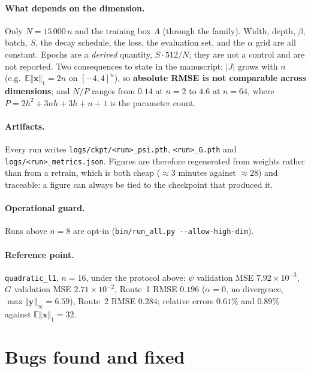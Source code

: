 \documentclass[11pt]{article}
\newcommand{\file}[1]{\texttt{#1}}
\newcommand{\bx}{\boldsymbol{x}}
\newcommand{\by}{\boldsymbol{y}}
\newcommand{\abs}[1]{\left\vert #1 \right\vert}
\newcommand{\norminf}[1]{\left\Vert #1 \right\Vert_{\infty}}
\newcommand{\normone}[1]{\left\Vert #1 \right\Vert_{1}}
\begin{document}
\paragraph{What depends on the dimension.} Only $N=15\,000\,n$ and the training
box $A$ (through the family). Width, depth, $\beta$, batch, $S$, the decay
schedule, the loss, the evaluation set, and the $\alpha$ grid are all constant. Epochs are a \emph{derived} quantity, $S\cdot512/N$; they are not a control and are
not reported. Two consequences to state in the manuscript: $\abs{J}$ grows with
$n$ (e.g.\ $\mathbb{E}\normone{\bx}=2n$ on $[-4,4]^{n}$), so \textbf{absolute
RMSE is not comparable across dimensions}; and $N/P$ ranges from $0.14$ at $n=2$
to $4.6$ at $n=64$, where $P=2h^{2}+3nh+3h+n+1$ is the parameter count.

\paragraph{Artifacts.} Every run writes \file{logs/ckpt/<run>\_psi.pth},
\file{<run>\_G.pth} and \file{logs/<run>\_metrics.json}. Figures are therefore
regenerated from weights rather than from a retrain, which is both cheap
($\approx3$ minutes against $\approx28$) and traceable: a figure can always be
tied to the checkpoint that produced it.

\paragraph{Operational guard.} Runs above $n=8$ are opt-in
(\file{bin/run\_all.py -{}-allow-high-dim}).

\paragraph{Reference point.} \file{quadratic\_l1}, $n=16$, under the protocol
above: $\psi$ validation MSE $7.92\times10^{-3}$, $G$ validation MSE
$2.71\times10^{-2}$, Route~1 RMSE $0.196$ ($\alpha=0$, no divergence,
$\max\norminf{\by}=6.59$), Route~2 RMSE $0.284$; relative errors $0.61\%$ and
$0.89\%$ against $\mathbb{E}\normone{\bx}=32$.

\section{Bugs found and fixed}
\end{document}
